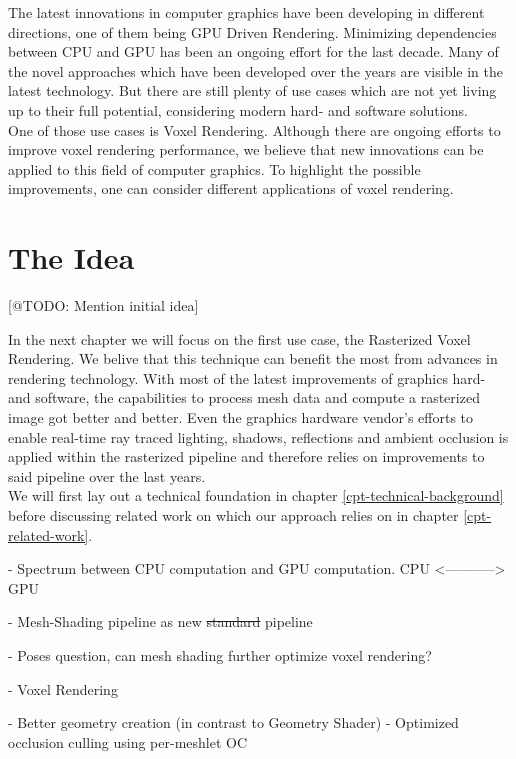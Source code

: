 The latest innovations in computer graphics have been developing in different directions,
one of them being \ac{GPU} Driven Rendering. Minimizing dependencies between \ac{CPU} and \ac{GPU} 
has been an ongoing effort for the last decade. Many of the novel approaches which have been developed 
over the years are visible in the latest technology. But there are still plenty of use cases 
which are not yet living up to their full potential, considering modern hard- and software solutions.\\

\noindent
One of those use cases is Voxel Rendering. Although there are ongoing efforts to improve voxel 
rendering performance, we believe that new innovations can be applied to this field of computer 
graphics. To highlight the possible improvements, one can consider different applications of 
voxel rendering. 






\section{The Idea}

[@TODO: Mention initial idea]

\noindent
In the next chapter we will focus on the first use case, the Rasterized Voxel Rendering. We belive that this 
technique can benefit the most from advances in rendering technology.
With most of the latest improvements of graphics hard- and software, the capabilities to process mesh data 
and compute a rasterized image got better and better. Even the graphics hardware vendor's efforts to enable 
real-time ray traced lighting, shadows, reflections and ambient occlusion is applied within the rasterized 
pipeline and therefore relies on improvements to said pipeline over the last years. \\
We will first lay out a technical foundation in chapter \ref{cpt-technical-background} before discussing 
related work on which our approach relies on in chapter \ref{cpt-related-work}.



- Spectrum between CPU computation and GPU computation. 
CPU <-----------> GPU

- Mesh-Shading pipeline as new \st{standard} pipeline

- Poses question, can mesh shading further optimize voxel rendering?

- Voxel Rendering

- Better geometry creation (in contrast to Geometry Shader)
- Optimized occlusion culling using per-meshlet OC
